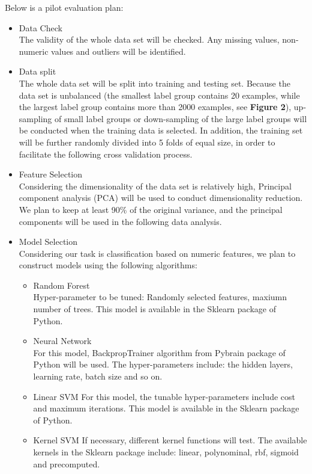 \documentclass[11pt]{article}
\begin{document}
Below is a pilot evaluation plan:
\begin{itemize}
	\item Data Check \\
	The validity of the whole data set will be checked. Any missing values, non-numeric values and outliers will be identified.
	\item Data split\\
	The whole data set will be split into training and testing set. Because the data set is unbalanced (the smallest label group contains 20 examples, while the largest label group contains more than 2000 examples, see \textbf{Figure 2}), up-sampling of small label groups or down-sampling of the large label groups will be conducted when the training data is selected. In addition, the training set will be further randomly divided into 5 folds of equal size, in order to facilitate the following cross validation process.
	\item Feature Selection \\
	Considering the dimensionality of the data set is relatively high, Principal component analysis (PCA) will be used to conduct dimensionality reduction. We plan to keep at least 90\% of the original variance, and the principal components will be used in the following data analysis.
	\item Model Selection \\
	Considering our task is classification based on numeric features, we plan to construct models using the following algorithms:
		\begin{itemize}
		\item Random Forest \\
		Hyper-parameter to be tuned: Randomly selected features, maxiumn number of trees. This model is available in the Sklearn package of Python. 
		\item Neural Network \\
		For this model, BackpropTrainer algorithm from Pybrain package of Python will be used. The hyper-parameters include: the hidden layers, learning rate, batch size and so on.
		\item Linear SVM
		For this model, the tunable hyper-parameters include cost and maximum iterations. This model is available in the Sklearn package of Python.
		\item Kernel SVM
		If necessary, different kernel functions will test. The available kernels in the Sklearn package include: linear, polynominal, rbf, sigmoid and precomputed. 
		\end{itemize}
		

\end{itemize}
\end{document}
